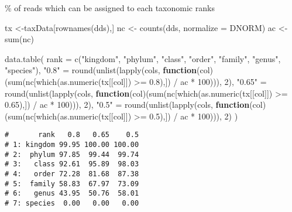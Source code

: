 \documentclass[
]{article}
\newenvironment{Shaded}{\begin{snugshade}}{\end{snugshade}}
\newcommand{\AttributeTok}[1]{\textcolor[rgb]{0.77,0.63,0.00}{#1}}
\newcommand{\ControlFlowTok}[1]{\textcolor[rgb]{0.13,0.29,0.53}{\textbf{#1}}}
\newcommand{\DecValTok}[1]{\textcolor[rgb]{0.00,0.00,0.81}{#1}}
\newcommand{\FloatTok}[1]{\textcolor[rgb]{0.00,0.00,0.81}{#1}}
\newcommand{\FunctionTok}[1]{\textcolor[rgb]{0.00,0.00,0.00}{#1}}
\newcommand{\NormalTok}[1]{#1}
\newcommand{\OtherTok}[1]{\textcolor[rgb]{0.56,0.35,0.01}{#1}}
\newcommand{\SpecialCharTok}[1]{\textcolor[rgb]{0.00,0.00,0.00}{#1}}
\newcommand{\StringTok}[1]{\textcolor[rgb]{0.31,0.60,0.02}{#1}}
\begin{document}
\% of reads which can be assigned to each taxonomic ranks

\begin{Shaded}
\begin{Highlighting}[]
\NormalTok{tx }\OtherTok{\textless{}{-}}\NormalTok{taxData[}\FunctionTok{rownames}\NormalTok{(dds),]}
\NormalTok{nc }\OtherTok{\textless{}{-}} \FunctionTok{counts}\NormalTok{(dds, }\AttributeTok{normalize =}\NormalTok{ DNORM)}
\NormalTok{ac }\OtherTok{\textless{}{-}} \FunctionTok{sum}\NormalTok{(nc)}

\FunctionTok{data.table}\NormalTok{(}
  \AttributeTok{rank =} \FunctionTok{c}\NormalTok{(}\StringTok{"kingdom"}\NormalTok{, }\StringTok{"phylum"}\NormalTok{, }\StringTok{"class"}\NormalTok{, }\StringTok{"order"}\NormalTok{, }\StringTok{"family"}\NormalTok{, }\StringTok{"genus"}\NormalTok{, }\StringTok{"species"}\NormalTok{),}
  \StringTok{"0.8"} \OtherTok{=} \FunctionTok{round}\NormalTok{(}\FunctionTok{unlist}\NormalTok{(}\FunctionTok{lapply}\NormalTok{(cols, }\ControlFlowTok{function}\NormalTok{(col)(}\FunctionTok{sum}\NormalTok{(nc[}\FunctionTok{which}\NormalTok{(}\FunctionTok{as.numeric}\NormalTok{(tx[[col]]) }\SpecialCharTok{\textgreater{}=} \FloatTok{0.8}\NormalTok{),]) }\SpecialCharTok{/}\NormalTok{ ac }\SpecialCharTok{*} \DecValTok{100}\NormalTok{))), }\DecValTok{2}\NormalTok{),}
  \StringTok{"0.65"} \OtherTok{=} \FunctionTok{round}\NormalTok{(}\FunctionTok{unlist}\NormalTok{(}\FunctionTok{lapply}\NormalTok{(cols, }\ControlFlowTok{function}\NormalTok{(col)(}\FunctionTok{sum}\NormalTok{(nc[}\FunctionTok{which}\NormalTok{(}\FunctionTok{as.numeric}\NormalTok{(tx[[col]]) }\SpecialCharTok{\textgreater{}=} \FloatTok{0.65}\NormalTok{),]) }\SpecialCharTok{/}\NormalTok{ ac }\SpecialCharTok{*} \DecValTok{100}\NormalTok{))), }\DecValTok{2}\NormalTok{),}
  \StringTok{"0.5"} \OtherTok{=} \FunctionTok{round}\NormalTok{(}\FunctionTok{unlist}\NormalTok{(}\FunctionTok{lapply}\NormalTok{(cols, }\ControlFlowTok{function}\NormalTok{(col)(}\FunctionTok{sum}\NormalTok{(nc[}\FunctionTok{which}\NormalTok{(}\FunctionTok{as.numeric}\NormalTok{(tx[[col]]) }\SpecialCharTok{\textgreater{}=} \FloatTok{0.5}\NormalTok{),]) }\SpecialCharTok{/}\NormalTok{ ac }\SpecialCharTok{*} \DecValTok{100}\NormalTok{))), }\DecValTok{2}\NormalTok{)}
\NormalTok{)}
\end{Highlighting}
\end{Shaded}

\begin{verbatim}
#       rank   0.8   0.65    0.5
# 1: kingdom 99.95 100.00 100.00
# 2:  phylum 97.85  99.44  99.74
# 3:   class 92.61  95.89  98.03
# 4:   order 72.28  81.68  87.38
# 5:  family 58.83  67.97  73.09
# 6:   genus 43.95  50.76  58.01
# 7: species  0.00   0.00   0.00
\end{verbatim}
\end{document}
